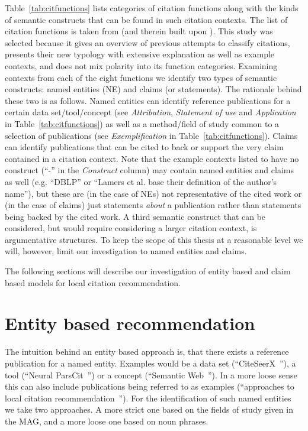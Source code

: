 Table~\ref{tab:citfunctions} lists categories of citation functions along with the kinds of semantic constructs that can be found in such citation contexts. The list of citation functions is taken from \cite{Petric2007} (and therein built upon \cite{Thompson2001}). This study was selected because it gives an overview of previous attempts to classify citations, presents their new typology with extensive explanation as well as example contexts, and does not mix polarity into its function categories. Examining contexts from each of the eight functions we identify two types of semantic constructs: named entities (NE) and claims (or statements). The rationale behind these two is as follows. Named entities can identify reference publications for a certain data set/tool/concept (see \emph{Attribution}, \emph{Statement of use} and \emph{Application} in Table~\ref{tab:citfunctions}) as well as a method/field of study common to a selection of publications (see \emph{Exemplification} in Table~\ref{tab:citfunctions}). Claims can identify publications that can be cited to back or support the very claim contained in a citation context. Note that the example contexts listed to have no construct (``-'' in the \emph{Construct} column) may contain named entities and claims as well (e.g. ``DBLP'' or ``Lamers et al. base their definition of the author's name''), but these are (in the case of NEs) not representative of the cited work or (in the case of claims) just statements \emph{about} a publication rather than statements being backed by the cited work.
A third semantic construct that can be considered, but would require considering a larger citation context, is argumentative structures. To keep the scope of this thesis at a reasonable level we will, however, limit our investigation to named entities and claims.

The following sections will describe our investigation of entity based and claim based models for local citation recommendation.

\section{Entity based recommendation}
The intuition behind an entity based approach is, that there exists a reference publication for a named entity. Examples would be a data set (``CiteSeerX~\cite{Caragea2014}''), a tool (``Neural ParsCit~\cite{Animesh2018}'') or a concept (``Semantic Web~\cite{Berners-Lee2001}''). In a more loose sense this can also include publications being referred to as examples (``approaches to local citation recommendation~\cite{He2010,Huang2014,Huang2015,Duma2014,Duma2016,Ebesu2017,Kobayashi2018,Jeong2019}'').
For the identification of such named entities we take two approaches. A more strict one based on the fields of study given in the MAG, and a more loose one based on noun phrases.

